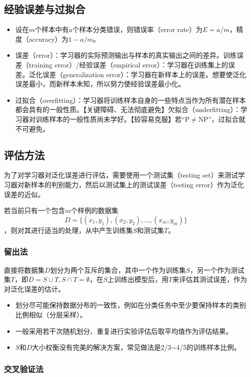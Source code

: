 \documentclass{ctexart}
\begin{document}
				\subsection{经验误差与过拟合}
					\begin{itemize}
						\item 设在$m$个样本中有$a$个样本分类错误，则错误率（error rate）为$E=a/m$，精度（accuracy）为$1-a/m$。
						\item 误差（error）：学习器的实际预测输出与样本的真实输出之间的差异。训练误差（training error）/经验误差（empirical error）：学习器在训练集上的误差。泛化误差（generalization error）：学习器在新样本上的误差。想要使泛化误差最小，而新样本未知，所以努力使经验误差最小化。
						\item 过拟合（overfitting）：学习器将训练样本自身的一些特点当作为所有潜在样本都会具有的一般性质。【关键障碍、无法彻底避免】欠拟合（underfitting）：学习器对训练样本的一般性质尚未学好。【较容易克服】若``P$\neq$NP''，过拟合就不可避免。
					\end{itemize}
				\subsection{评估方法}
				
					为了对学习器对泛化误差进行评估，需要使用一个测试集（testing set）来测试学习器对新样本的判别能力，然后以测试集上的测试误差（testing error）作为泛化误差的近似。
					
					若当前只有一个包含$m$个样例的数据集\[D=\{(x_1,y_1),(x_2,y_2),\dots,(x_m,y_m)\}\]，则对其进行适当的处理，从中产生训练集$S$和测试集$T$。
					\subsubsection{留出法}
					
						直接将数据集$D$划分为两个互斥的集合，其中一个作为训练集$S$，另一个作为测试集$T$，即$D=S\cup T,S\cap T=\emptyset$，在$S$上训练出模型后，用$T$来评估其测试误差，作为对泛化误差的估计。
						\begin{itemize}
							\item 划分尽可能保持数据分布的一致性，例如在分类任务中至少要保持样本的类别比例相似（分层采样）。
							\item 一般采用若干次随机划分、重复进行实验评估后取平均值作为评估结果。
							\item $S$和$D$大小权衡没有完美的解决方案，常见做法是2/3$\sim$4/5的训练样本比例。
						\end{itemize}
					\subsubsection{交叉验证法}
						
\end{document}
